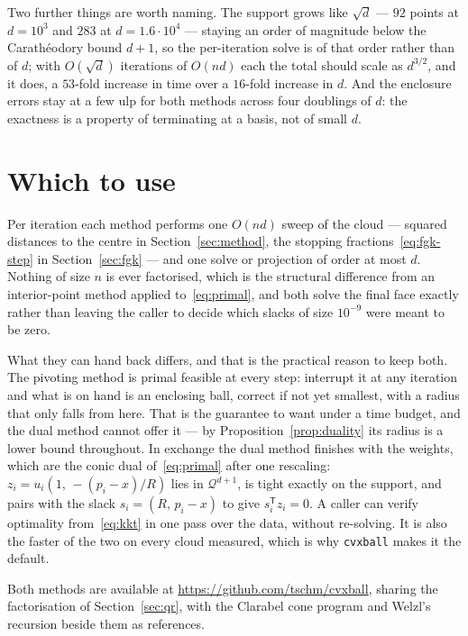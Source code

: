 \documentclass[10pt,a4paper]{article}
\theoremstyle{plain}
\newcommand{\T}{^{\mathsf{T}}}
\begin{document}
Two further things are worth naming. The support grows like $\sqrt d$ --- $92$
points at $d=10^3$ and $283$ at $d=1.6\cdot10^4$ --- staying an order of magnitude
below the Carath\'eodory bound $d+1$, so the per-iteration solve is of that order
rather than of $d$; with $O(\sqrt d)$ iterations of $O(nd)$ each the total should
scale as $d^{3/2}$, and it does, a $53$-fold increase in time over a $16$-fold
increase in $d$. And the enclosure errors stay at a few ulp for both methods
across four doublings of $d$: the exactness is a property of terminating at a
basis, not of small $d$.

\section{Which to use}
\label{sec:cost}

Per iteration each method performs one $O(nd)$ sweep of the cloud --- squared
distances to the centre in Section~\ref{sec:method}, the stopping
fractions~\eqref{eq:fgk-step} in Section~\ref{sec:fgk} --- and one solve or
projection of order at most $d$. Nothing of size $n$ is ever factorised, which is
the structural difference from an interior-point method applied
to~\eqref{eq:primal}, and both solve the final face exactly rather than leaving
the caller to decide which slacks of size $10^{-9}$ were meant to be zero.

What they can hand back differs, and that is the practical reason to keep both.
The pivoting method is primal feasible at every step: interrupt it at any
iteration and what is on hand is an enclosing ball, correct if not yet smallest,
with a radius that only falls from here. That is the guarantee to want under a
time budget, and the dual method cannot offer it --- by
Proposition~\ref{prop:duality} its radius is a lower bound throughout. In exchange
the dual method finishes with the weights, which are the conic dual
of~\eqref{eq:primal} after one rescaling: $z_i=u_i(1,\,-(p_i-x)/R)$ lies in
$\mathcal{Q}^{d+1}$, is tight exactly on the support, and pairs with the slack
$s_i=(R,\,p_i-x)$ to give $s_i\T z_i=0$. A caller can verify optimality
from~\eqref{eq:kkt} in one pass over the data, without re-solving. It is also the
faster of the two on every cloud measured, which is why \texttt{cvxball} makes it
the default.

Both methods are available at \url{https://github.com/tschm/cvxball}, sharing the
factorisation of Section~\ref{sec:qr}, with the Clarabel cone program and Welzl's
recursion beside them as references.
\end{document}

